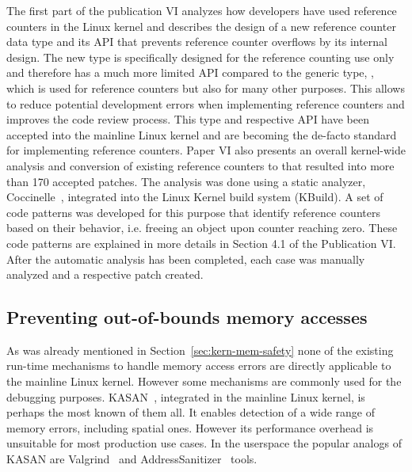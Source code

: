 The first part of the publication VI analyzes how developers have used reference counters in the Linux kernel and describes the design of a new reference counter data type  and its API that prevents reference counter overflows by its internal design. 
The new type is specifically designed for the reference counting use only and therefore has a much more limited API compared to the generic type, , which is used for reference counters but also for many other purposes. This allows to reduce potential development errors when implementing reference counters and improves the code review process.   
This type and respective API have been accepted into the mainline Linux kernel and are becoming the de-facto standard for implementing reference counters. 
Paper VI also presents an overall kernel-wide analysis and conversion of existing reference counters to  that resulted into more than 170 accepted patches. The analysis was done using a static analyzer, Coccinelle~\cite{coccinelle}, integrated into the Linux Kernel build system (KBuild). A set of code patterns was developed for this purpose that identify reference counters based on their behavior, i.e. freeing an object upon counter reaching zero. These code patterns are explained in more details in Section 4.1 of the Publication VI. After the automatic analysis has been completed, each case was manually analyzed and a respective patch created. 


\subsection{Preventing out-of-bounds memory accesses}
\label{sec:kern-mem-out-of-bounds}

As was already mentioned in Section~\ref{sec:kern-mem-safety} none of the existing run-time mechanisms to handle memory access errors are directly applicable to the mainline Linux kernel. However some mechanisms are commonly used for the debugging purposes.
KASAN~\cite{kasan}, integrated in the mainline Linux kernel, is perhaps the most known of them all. It enables detection of a wide range of memory errors, including spatial ones. However its performance overhead is unsuitable for most production use cases.
In the userspace the popular analogs of KASAN are Valgrind~\cite{nethercote2007valgrind} and AddressSanitizer~\cite{serebryany2012addresssanitizer} tools. 

